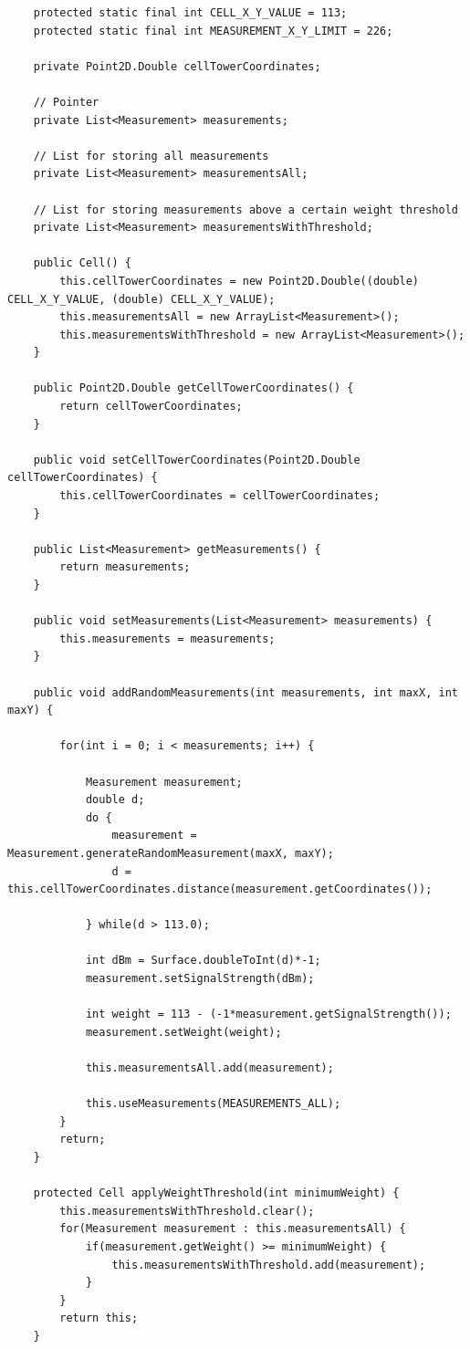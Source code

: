 \documentclass[a4paper, 12pt]{article}
\begin{document}
\begin{lstlisting}
	protected static final int CELL_X_Y_VALUE = 113;
	protected static final int MEASUREMENT_X_Y_LIMIT = 226;
	
	private Point2D.Double cellTowerCoordinates;
	
	// Pointer
	private List<Measurement> measurements;
	
	// List for storing all measurements
	private List<Measurement> measurementsAll;
	
	// List for storing measurements above a certain weight threshold
	private List<Measurement> measurementsWithThreshold;
	
	public Cell() {
		this.cellTowerCoordinates = new Point2D.Double((double) CELL_X_Y_VALUE, (double) CELL_X_Y_VALUE);
		this.measurementsAll = new ArrayList<Measurement>();
		this.measurementsWithThreshold = new ArrayList<Measurement>();
	}

	public Point2D.Double getCellTowerCoordinates() {
		return cellTowerCoordinates;
	}

	public void setCellTowerCoordinates(Point2D.Double cellTowerCoordinates) {
		this.cellTowerCoordinates = cellTowerCoordinates;
	}

	public List<Measurement> getMeasurements() {
		return measurements;
	}

	public void setMeasurements(List<Measurement> measurements) {
		this.measurements = measurements;
	}

	public void addRandomMeasurements(int measurements, int maxX, int maxY) {
		
		for(int i = 0; i < measurements; i++) {

			Measurement measurement;
			double d;
			do {
				measurement = Measurement.generateRandomMeasurement(maxX, maxY);
				d = this.cellTowerCoordinates.distance(measurement.getCoordinates());
				
			} while(d > 113.0);
			
			int dBm = Surface.doubleToInt(d)*-1;
			measurement.setSignalStrength(dBm);
			
			int weight = 113 - (-1*measurement.getSignalStrength());
			measurement.setWeight(weight);
		
			this.measurementsAll.add(measurement);
			
			this.useMeasurements(MEASUREMENTS_ALL);
		}
		return;
	}
	
	protected Cell applyWeightThreshold(int minimumWeight) {
		this.measurementsWithThreshold.clear();
		for(Measurement measurement : this.measurementsAll) {
			if(measurement.getWeight() >= minimumWeight) {
				this.measurementsWithThreshold.add(measurement);
			}
		}
		return this;
	}
	

\end{lstlisting}
\end{document}
